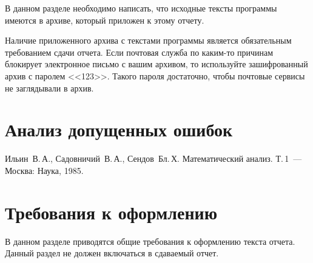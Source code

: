 \documentclass[a4paper,12pt,titlepage,final]{article}
\begin{document}
В данном разделе необходимо написать, что
исходные тексты программы имеются в архиве, который приложен к этому отчету.

Наличие приложенного архива с текстами программы является обязательным
требованием сдачи отчета. Если почтовая служба по каким-то причинам блокирует
электронное письмо с вашим архивом, то используйте зашифрованный архив с паролем <<123>>.
Такого пароля достаточно, чтобы почтовые сервисы не заглядывали в архив.

\newpage

\section{Анализ допущенных ошибок}

\newpage
\begin{raggedright}
\begin{thebibliography}{99}
 Ильин~В.\,А., Садовничий~В.\,А., Сендов~Бл.\,Х. Математический анализ. Т.\,1~---
    Москва: Наука, 1985.
\end{thebibliography}
\end{raggedright}

\newpage

\section*{Требования к оформлению}

В данном разделе приводятся общие требования к оформлению текста отчета.
Данный раздел не должен включаться в сдаваемый отчет.
\end{document}
